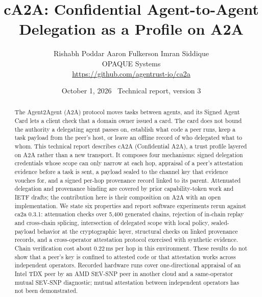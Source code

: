 \documentclass[10pt,letterpaper]{article}
\title{\textbf{cA2A: Confidential Agent-to-Agent Delegation as a Profile on A2A}}
\author{
  Rishabh Poddar \quad Aaron Fulkerson \quad Imran Siddique \\
  OPAQUE Systems \\[4pt]
  \normalsize \url{https://github.com/agentrust-io/ca2a}
}
\date{October 1, 2026 \ \small Technical report, version 3}
\begin{document}
\maketitle

\begin{abstract}
The Agent2Agent (A2A) protocol moves tasks between agents, and its Signed Agent Card lets a
client check that a domain owner issued a card. The card does not bound the authority a
delegating agent passes on, establish what code a peer runs, keep a task payload from the
peer's host, or leave an offline record of who delegated what to whom. This technical report
describes cA2A (Confidential A2A), a trust profile layered on A2A rather than a new transport.
It composes four mechanisms: signed delegation credentials whose scope can only narrow at each
hop, appraisal of a peer's attestation evidence before a task is sent, a payload sealed to the
channel key that evidence vouches for, and a signed per-hop provenance record linked to its
parent. Attenuated delegation and provenance binding are covered by prior capability-token work
and IETF drafts; the contribution here is their composition on A2A with an open implementation.
We state six properties and report software experiments rerun against ca2a 0.3.1: attenuation
checks over 5,400 generated chains, rejection of in-chain replay and cross-chain splicing,
intersection of delegated scope with local policy, sealed-payload behavior at the cryptographic layer, structural checks on linked
provenance records, and a cross-operator attestation protocol exercised with synthetic
evidence. Chain verification cost about 0.22\,ms per hop in this environment. These results do
not show that a peer's key is confined to attested code or that attestation works across
independent operators. Recorded hardware runs cover one-directional appraisal of an Intel TDX
peer by an AMD SEV-SNP peer in another cloud and a same-operator mutual SEV-SNP diagnostic;
mutual attestation between independent operators has not been demonstrated.
\end{abstract}
\end{document}
